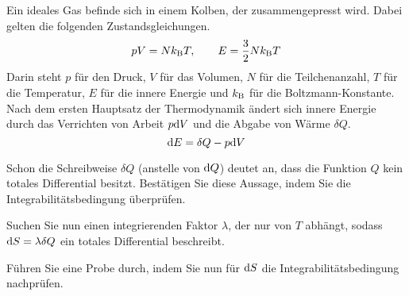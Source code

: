 \begin{atiTask}[
  title = Ideales Gas
]
  Ein ideales Gas befinde sich in einem Kolben, der zusammengepresst wird.
  Dabei gelten die folgenden Zustandsgleichungen.
  \[
    pV = Nk_{\mathrm{B}}T ,\qquad E = \frac{3}{2}Nk_{\mathrm{B}}T
  \]
  Darin steht $p$ für den Druck, $V$ für das Volumen, $N$ für die Teilchenanzahl, $T$ für die Temperatur, $E$ für die innere Energie und $k_{\mathrm{B}}$ für die Boltzmann-Konstante.
  Nach dem ersten Hauptsatz der Thermodynamik ändert sich innere Energie durch das Verrichten von Arbeit $p\mathrm{d} V$ und die Abgabe von Wärme $\delta Q$.
  \[
    \mathrm{d} E = \delta Q - p\mathrm{d} V
  \]
  \begin{atiSubtasks}
    \item{
      Schon die Schreibweise $\delta Q$ (anstelle von $\mathrm{d} Q$) deutet an, dass die Funktion $Q$ kein totales Differential besitzt.
      Bestätigen Sie diese Aussage, indem Sie die Integrabilitätsbedingung überprüfen.
    }
    \item{
      Suchen Sie nun einen integrierenden Faktor $\lambda$, der nur von $T$ abhängt, sodass $\mathrm{d} S = \lambda \delta Q$ ein totales Differential beschreibt.
    }
    \item{
      Führen Sie eine Probe durch, indem Sie nun für $\mathrm{d} S$ die Integrabilitätsbedingung nachprüfen.
    }
  \end{atiSubtasks}
\end{atiTask}